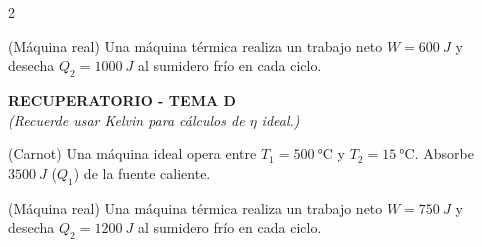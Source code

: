 \documentclass[12pt,a4paper]{exam}
\newcommand{\nombre}{\noindent\makebox[\linewidth]{\textbf{Nombre y Apellido:}\enspace\hrulefill}\vspace{0.25cm}}
\newcommand{\notakelvin}{\small \textit{(Recuerde usar Kelvin para cálculos de $\eta$ ideal.)}}
\begin{document}
\begin{multicols}{2}
\begin{questions}
 \question (Máquina real) Una máquina térmica realiza un trabajo neto $W = \SI{600}{J}$ y desecha $Q_2 = \SI{1000}{J}$ al sumidero frío en cada ciclo.
\end{questions}
\vfill %

\nombre
\begin{center}
    \textbf{RECUPERATORIO - TEMA D} \\
    \notakelvin
\end{center}
\vspace{0.1cm}
\begin{questions}
 \question (Carnot) Una máquina ideal opera entre $T_1 = \SI{500}{\celsius}$ y $T_2 = \SI{15}{\celsius}$. Absorbe $\SI{3500}{J}$ ($Q_1$) de la fuente caliente.
 \question (Máquina real) Una máquina térmica realiza un trabajo neto $W = \SI{750}{J}$ y desecha $Q_2 = \SI{1200}{J}$ al sumidero frío en cada ciclo.
      \begin{parts}

\end{parts}
\end{questions}
\end{multicols}
\end{document}
